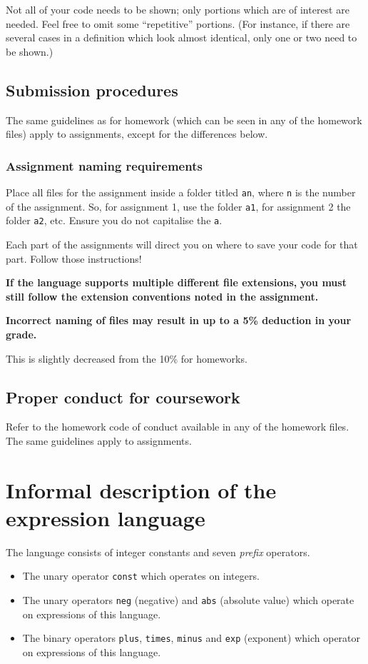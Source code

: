 \documentclass[11pt]{article}
\begin{document}
Not all of your code needs to be shown;
only portions which are of interest are needed.
Feel free to omit some “repetitive” portions.
(For instance, if there are several cases in a definition
which look almost identical, only one or two need to be shown.)

\subsection*{Submission procedures}
\label{sec:orgfa0f844}
The same guidelines as for homework
(which can be seen in any of the homework files)
apply to assignments, except for the differences below.

\subsubsection*{Assignment naming requirements}
\label{sec:org7792d9b}

Place all files for the assignment
inside a folder titled \texttt{an}, where \texttt{n} is the number of the assignment.
So, for assignment 1, use the folder \texttt{a1}, for assignment 2 the folder \texttt{a2}, etc.
Ensure you do not capitalise the \texttt{a}.

Each part of the assignments will direct you on where to
save your code for that part. Follow those instructions!

\begin{center}
\textbf{If the language supports multiple different file extensions,}
\textbf{you must still follow the extension conventions noted in the assignment.}
\end{center}

\begin{center}
\textbf{Incorrect naming of files may result in up to a 5\% deduction in your grade.}
\end{center}
This is slightly decreased from the 10\% for homeworks.

\subsection*{Proper conduct for coursework}
\label{sec:org9cc9f18}
Refer to the homework code of conduct available in any of the homework files.
The same guidelines apply to assignments.

\section*{Informal description of the expression language}
\label{sec:org66120b5}
The language consists of integer constants and seven \emph{prefix} operators.
\begin{itemize}
\item The unary operator \texttt{const} which operates on integers.
\item The unary operators \texttt{neg} (negative) and \texttt{abs} (absolute value)
which operate on expressions of this language.
\item The binary operators \texttt{plus}, \texttt{times}, \texttt{minus} and \texttt{exp} (exponent)
which operator on expressions of this language.
\end{itemize}
\end{document}

